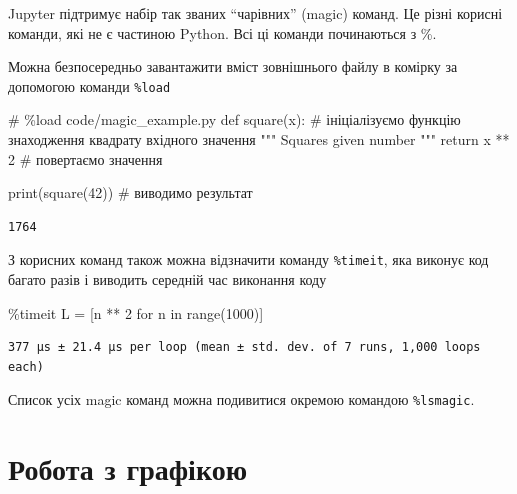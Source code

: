 \documentclass[
  letterpaper,
]{report}
\newenvironment{Shaded}{\begin{snugshade}}{\end{snugshade}}
\newcommand{\BuiltInTok}[1]{\textcolor[rgb]{0.00,0.23,0.31}{#1}}
\newcommand{\CommentTok}[1]{\textcolor[rgb]{0.37,0.37,0.37}{#1}}
\newcommand{\ControlFlowTok}[1]{\textcolor[rgb]{0.00,0.23,0.31}{#1}}
\newcommand{\DecValTok}[1]{\textcolor[rgb]{0.68,0.00,0.00}{#1}}
\newcommand{\KeywordTok}[1]{\textcolor[rgb]{0.00,0.23,0.31}{#1}}
\newcommand{\NormalTok}[1]{\textcolor[rgb]{0.00,0.23,0.31}{#1}}
\newcommand{\OperatorTok}[1]{\textcolor[rgb]{0.37,0.37,0.37}{#1}}
\begin{document}
Jupyter підтримує набір так званих ``чарівних'' (magic) команд. Це різні
корисні команди, які не є частиною Python. Всі ці команди починаються з
\%.

Можна безпосередньо завантажити вміст зовнішнього файлу в комірку за
допомогою команди \texttt{\%load}

\begin{Shaded}
\begin{Highlighting}[]
\CommentTok{\# \%load code/magic\_example.py}
\KeywordTok{def}\NormalTok{ square(x): }\CommentTok{\# ініціалізуємо функцію знаходження квадрату вхідного значення}
    \CommentTok{"""}
\CommentTok{    Squares given number}
\CommentTok{    """}
    \ControlFlowTok{return}\NormalTok{ x }\OperatorTok{**} \DecValTok{2} \CommentTok{\# повертаємо значення}


\BuiltInTok{print}\NormalTok{(square(}\DecValTok{42}\NormalTok{)) }\CommentTok{\# виводимо результат}
\end{Highlighting}
\end{Shaded}

\begin{verbatim}
1764
\end{verbatim}

З корисних команд також можна відзначити команду \texttt{\%timeit}, яка
виконує код багато разів і виводить середній час виконання коду

\begin{Shaded}
\begin{Highlighting}[]
\OperatorTok{\%}\NormalTok{timeit L }\OperatorTok{=}\NormalTok{ [n }\OperatorTok{**} \DecValTok{2} \ControlFlowTok{for}\NormalTok{ n }\KeywordTok{in} \BuiltInTok{range}\NormalTok{(}\DecValTok{1000}\NormalTok{)]}
\end{Highlighting}
\end{Shaded}

\begin{verbatim}
377 µs ± 21.4 µs per loop (mean ± std. dev. of 7 runs, 1,000 loops each)
\end{verbatim}

Список усіх magic команд можна подивитися окремою командою
\texttt{\%lsmagic}.

\hypertarget{ux440ux43eux431ux43eux442ux430-ux437-ux433ux440ux430ux444ux456ux43aux43eux44e}{%
\section{Робота з
графікою}\label{ux440ux43eux431ux43eux442ux430-ux437-ux433ux440ux430ux444ux456ux43aux43eux44e}}
\end{document}
